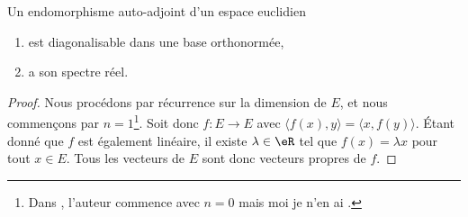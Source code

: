 \begin{theorem} \label{ThoRSBahHH}
    Un endomorphisme auto-adjoint d'un espace euclidien
    \begin{enumerate}
        \item
            est diagonalisable dans une base orthonormée,
        \item
            a son spectre réel.
    \end{enumerate}
\end{theorem}

\begin{proof}
    Nous procédons par récurrence sur la dimension de \( E\), et nous commençons par \( n=1\)\footnote{Dans \cite{KXjFWKA}, l'auteur commence avec \( n=0\) mais moi je n'en ai .}. Soit donc \( f\colon E\to E\) avec \( \langle f(x), y\rangle =\langle x, f(y)\rangle \). Étant donné que \( f\) est également linéaire, il existe \( \lambda\in \eR\) tel que \( f(x)=\lambda x\) pour tout \( x\in E\). Tous les vecteurs de \( E\) sont donc vecteurs propres de \( f\).


\end{proof}
